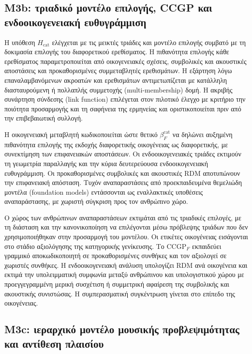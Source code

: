 \documentclass[11pt,a4paper]{article}
\begin{document}
\subsection{M3b: τριαδικό μοντέλο επιλογής, CCGP και ενδοοικογενειακή ευθυγράμμιση}\label{app:stats-m3b}

Η υπόθεση $H_{\mathrm{cat}}$ ελέγχεται με τις μεικτές τριάδες και μοντέλο επιλογής συμβατό με τη δοκιμασία επιλογής του διαφορετικού ερεθίσματος. Η πιθανότητα επιλογής κάθε ερεθίσματος παραμετροποιείται από οικογενειακές σχέσεις, συμβολικές και ακουστικές αποστάσεις και προκαθορισμένες συμμεταβλητές ερεθισμάτων. Η εξάρτηση λόγω επαναλαμβανόμενων ακροατών και ερεθισμάτων αντιμετωπίζεται με κατάλληλη διασταυρούμενη ή πολλαπλής συμμετοχής (multi-membership) δομή. Η ακριβής συνάρτηση σύνδεσης (link function) επιλέγεται στον πιλοτικό έλεγχο με κριτήριο την ποιότητα προσαρμογής και τη σαφήνεια της ερμηνείας και οριστικοποιείται πριν από την επιβεβαιωτική συλλογή.

Η οικογενειακή μεταβλητή κωδικοποιείται ώστε θετικό $\beta_F^{\mathrm{cat}}$ να δηλώνει αυξημένη πιθανότητα επιλογής της εκδοχής διαφορετικής οικογένειας ως διαφορετικής, με συνεκτίμηση των επιφανειακών αποστάσεων. Οι ενδοοικογενειακές τριάδες εκτιμούν τη γεωμετρία παραλλαγής και την κύρια δευτερεύουσα ενδοοικογενειακή ευθυγράμμιση. Οι προκαθορισμένες συμβολικές και ακουστικές RDM αποτυπώνουν την επιφανειακή απόσταση. Τυχόν αναπαραστάσεις από προεκπαιδευμένα θεμελιώδη μοντέλα (foundation models) εντάσσονται ως εναλλακτικές υποθέσεις αναπαράστασης, με χωριστή σύγκριση προς τον ανθρώπινο χώρο.

Ο χώρος των ανθρώπινων αναπαραστάσεων εκτιμάται από τις τριαδικές επιλογές, με τη διάσταση και την κανονικοποίηση να επιλέγονται μέσω πρόβλεψης τριάδων που δεν χρησιμοποιήθηκαν στην προσαρμογή του μοντέλου. Οι ετικέτες οικογένειας εισάγονται στο στάδιο αξιολόγησης της κατηγορικής γενίκευσης. Το $\mathrm{CCGP}_F$ εκπαιδεύει γραμμικό αποκωδικοποιητή σε προκαθορισμένες συνθήκες και τον αξιολογεί σε χωριστές συνθήκες. Η ενδοοικογενειακή ανάλυση υπολογίζει RDM ανά οικογένεια και εκτιμά την υπολειμματική συμφωνία μεταξύ ανθρώπινου και υπολογιστικού χώρου με προεγγεγραμμένη μερική συσχέτιση ή συμμετρική αφαίρεση της συμβολικής και ακουστικής συνιστώσας. Η συμπερασματική συγκέντρωση γίνεται στο επίπεδο της οικογένειας.

\subsection{M3c: ιεραρχικό μοντέλο μουσικής προβλεψιμότητας και αντίθεση πλαισίου}\label{app:stats-m3c}
\end{document}
